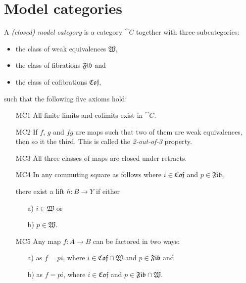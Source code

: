 
\section{Model categories}
\label{sec:model_cats}

\newcommand{\W}{\mathfrak{W}}
\newcommand{\Fib}{\mathfrak{Fib}}
\newcommand{\Cof}{\mathfrak{Cof}}

\begin{definition}
	A \emph{(closed) model category} is a category $\cat{C}$ together with three subcategories:
	\begin{itemize}
		\item the class of weak equivalences $\W$,
		\item the class of fibrations $\Fib$ and
		\item the class of cofibrations $\Cof$,
	\end{itemize}
	such that the following five axioms hold:
	\begin{itemize}
		\item[MC1] All finite limits and colimits exist in $\cat{C}$.
		\item[MC2] If $f$, $g$ and $fg$ are maps such that two of them are weak equivalences, then so it the third. This is called the \emph{2-out-of-3} property.
		\item[MC3] All three classes of maps are closed under retracts.
		\item[MC4] In any commuting square as follows where $i \in \Cof$ and $p \in \Fib$,
		\begin{center}
		\end{center}

		 there exist a lift $h: B \to Y$ if either 
		\begin{itemize}
			\item[a)] $i \in \W$ or
			\item[b)] $p \in \W$.
		\end{itemize}
		\item[MC5] Any map $f : A \to B$ can be factored in two ways:
		\begin{itemize}
			\item[a)] as $f = pi$, where $i \in \Cof \cap \W$ and $p \in \Fib$ and
			\item[b)] as $f = pi$, where $i \in \Cof$ and $p \in \Fib \cap \W$.
		\end{itemize}
	\end{itemize}
\end{definition}

